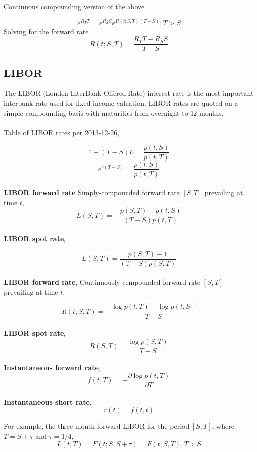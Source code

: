 Continuous compounding version of the above

\[
e^{R_TT}=e^{R_SS}e^{R(t;S,T)(T-S)};T>S
\]
Solving for the forward rate
\[
R(t;S,T)=\frac{R_TT-R_SS}{T-S}
\]

\subsection{LIBOR}
The LIBOR (London InterBank Offered Rate) interest rate is the most important interbank rate
used for fixed income valuation. LIBOR rates are quoted on a simple compounding basis with maturities
from overnight to 12 months.
\\
\\
Table of LIBOR rates per 2013-12-26,




\[ 
1+(T-S)L=\frac{p(t,S)}{p(t,T)}
\]
\[ 
e^{r(T-S)}=\frac{p(t,S)}{p(t,T)}
\]
\\
\textbf{LIBOR forward rate}
Simply-compounded forward rate $[S,T]$ prevailing at time $t$,
\[
L(S,T) = -\frac{p(S,T)-p(t,S)}{(T-S)p(t,T)}
\]
\\
\textbf{LIBOR spot rate},

\[
L(S,T)=\frac{p(S,T)-1}{(T-S)p(S,T)}
\]
\\
\textbf{LIBOR forward rate},
Continuously compounded forward rate $[S,T]$ prevailing at time $t$,

\[
R(t;S,T)=-\frac{\log{p(t,T)}-\log{p(t,S)}}{T-S}
\]
\\
\textbf{LIBOR spot rate},
\[
R(S,T)=\frac{\log{p(S,T)}}{T-S}
\]
\\
\textbf{Instantaneous forward rate},
\[
f(t,T)=-\frac{\partial\log{p(t,T)}}{\partial{T}}
\]
\\
\textbf{Instantaneous short rate},
\[
r(t)=f(t,t)
\]

For example, the three-month forward LIBOR for the period $[S,T]$, where $T=S+\tau$ and $\tau=1/4$,
\[
L(t,T) = F(t;S,S+\tau) = F(t;S,T), T>S
\]

